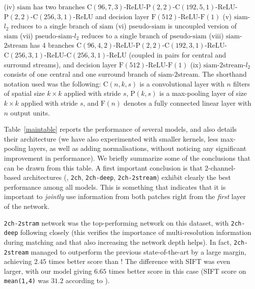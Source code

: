 \documentclass[10pt,twocolumn,letterpaper]{article}
\begin{document}
\begin{table*}[t]
{(iv) $\mathrm{siam}$ has two branches $\mathrm{C}(96,7,3)$-$\mathrm{ReLU}$-$\mathrm{P}(2,2)$-$\mathrm{C}(192,5,1)$-$\mathrm{ReLU}$-$\mathrm{P}(2,2)$-$\mathrm{C}(256,3,1)$-$\mathrm{ReLU}$ and decision layer $\mathrm{F}(512)$-$\mathrm{ReLU}$-$\mathrm{F}(1)$
(v) $\mathrm{siam}$-$l_2$ reduces to a single branch of $\mathrm{siam}$ 
(vi) $\mathrm{pseudo}$-$\mathrm{siam}$ is uncoupled version of $\mathrm{siam}$
(vii) $\mathrm{pseudo}$-$\mathrm{siam}$-$l_2$ reduces to a single branch of $\mathrm{pseudo}$-$\mathrm{siam}$ 
(viii) $\mathrm{siam}$-$\mathrm{2stream}$ has 4 branches $\mathrm{C}(96,4,2)$-$\mathrm{ReLU}$-$\mathrm{P}(2,2)$-$\mathrm{C}(192,3,1)$-$\mathrm{ReLU}$-$\mathrm{C}(256,3,1)$-$\mathrm{ReLU}$-$\mathrm{C}(256,3,1)$-$\mathrm{ReLU}$ (coupled in pairs for central and surround streams), and decision layer $\mathrm{F}(512)$-$\mathrm{ReLU}$-$\mathrm{F}(1)$
(ix) $\mathrm{siam}$-$\mathrm{2stream}$-$l_2$ consists of one central and one surround branch of $\mathrm{siam}$-$\mathrm{2stream}$. 
 The shorthand notation used was the following: $\mathrm{C}(n,k,s)$ is a convolutional layer with $n$ filters of spatial size $k\times k$ applied with stride $s$, $\mathrm{P}(k,s)$ is a max-pooling layer of size $k\times k$ applied with stride $s$, and $\mathrm{F}(n)$ denotes a fully connected linear layer with $n$ output units.}
\label{maintable}
\end{table*}





Table~\ref{maintable} reports the performance of several models, and also details their architecture (we  have also experimented with smaller kernels, less max-pooling layers, as well as adding normalisations, without noticing any significant improvement in performance).
We briefly summarize some of the conclusions that can be drawn from this table. A first important conclusion  is that 
  2-channel-based architectures (\eg, \texttt{2ch}, \texttt{2ch-deep}, \texttt{2ch-2stream})   exhibit clearly the best performance among all models. This  is something that indicates that  it is important to \emph{jointly} use information from both patches {right from the \emph{first} layer} of the network. 


\texttt{2ch-2stram} network  was the top-performing network on this dataset, with  \texttt{2ch-deep} following closely (this verifies the importance of multi-resolution information during matching and that also increasing the network depth helps). In fact,  \texttt{2ch-2stream} managed  to outperform the previous state-of-the-art  by a large margin, achieving $2.45$ times better score than    \cite{Simonyan14}! The difference with   SIFT was even larger, with our model giving  $6.65$ times better score in this case (SIFT score  on \texttt{mean(1,4)} was $31.2$ according to \cite{BHW10}).
\end{document}
